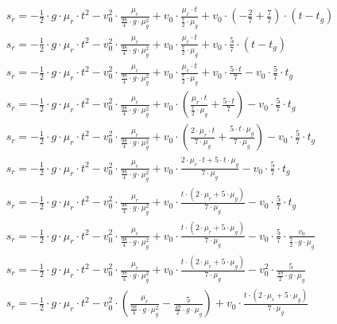 \begin{align}
    s_r = - \frac{1}{2} \cdot g \cdot \mu_r \cdot t^2 - v_0^2 \cdot \frac{\mu_r}{\frac{98}{4} \cdot g \cdot \mu_g^2} + v_0 \cdot \frac{\mu_r \cdot t}{\frac{7}{2} \cdot \mu_g} + v_0 \cdot (-\frac{2}{7} + \frac{7}{7}) \cdot (t - t_g)\\
    s_r = - \frac{1}{2} \cdot g \cdot \mu_r \cdot t^2 - v_0^2 \cdot \frac{\mu_r}{\frac{98}{4} \cdot g \cdot \mu_g^2} + v_0 \cdot \frac{\mu_r \cdot t}{\frac{7}{2} \cdot \mu_g} + v_0 \cdot \frac{5}{7} \cdot (t - t_g)\\
    s_r = - \frac{1}{2} \cdot g \cdot \mu_r \cdot t^2 - v_0^2 \cdot \frac{\mu_r}{\frac{98}{4} \cdot g \cdot \mu_g^2} + v_0 \cdot \frac{\mu_r \cdot t}{\frac{7}{2} \cdot \mu_g} + v_0 \cdot \frac{5 \cdot t}{7} - v_0 \cdot \frac{5}{7} \cdot t_g\\
    s_r = - \frac{1}{2} \cdot g \cdot \mu_r \cdot t^2 - v_0^2 \cdot \frac{\mu_r}{\frac{98}{4} \cdot g \cdot \mu_g^2} + v_0 \cdot (\frac{\mu_r \cdot t}{\frac{7}{2} \cdot \mu_g} + \frac{5 \cdot t}{7}) - v_0 \cdot \frac{5}{7} \cdot t_g\\
    s_r = - \frac{1}{2} \cdot g \cdot \mu_r \cdot t^2 - v_0^2 \cdot \frac{\mu_r}{\frac{98}{4} \cdot g \cdot \mu_g^2} + v_0 \cdot (\frac{2 \cdot \mu_r \cdot t}{7 \cdot \mu_g} + \frac{5 \cdot t \cdot \mu_g}{7 \cdot \mu_g}) - v_0 \cdot \frac{5}{7} \cdot t_g\\
    s_r = - \frac{1}{2} \cdot g \cdot \mu_r \cdot t^2 - v_0^2 \cdot \frac{\mu_r}{\frac{98}{4} \cdot g \cdot \mu_g^2} + v_0 \cdot \frac{2 \cdot \mu_r \cdot t + 5 \cdot t \cdot \mu_g}{7 \cdot \mu_g} - v_0 \cdot \frac{5}{7} \cdot t_g\\
    s_r = - \frac{1}{2} \cdot g \cdot \mu_r \cdot t^2 - v_0^2 \cdot \frac{\mu_r}{\frac{98}{4} \cdot g \cdot \mu_g^2} + v_0 \cdot \frac{t \cdot (2 \cdot \mu_r + 5 \cdot \mu_g)}{7 \cdot \mu_g} - v_0 \cdot \frac{5}{7} \cdot t_g\\
    s_r = - \frac{1}{2} \cdot g \cdot \mu_r \cdot t^2 - v_0^2 \cdot \frac{\mu_r}{\frac{98}{4} \cdot g \cdot \mu_g^2} + v_0 \cdot \frac{t \cdot (2 \cdot \mu_r + 5 \cdot \mu_g)}{7 \cdot \mu_g} - v_0 \cdot \frac{5}{7} \cdot \frac{v_0}{\frac{7}{2} \cdot g \cdot \mu_g}\\
    s_r = - \frac{1}{2} \cdot g \cdot \mu_r \cdot t^2 - v_0^2 \cdot \frac{\mu_r}{\frac{98}{4} \cdot g \cdot \mu_g^2} + v_0 \cdot \frac{t \cdot (2 \cdot \mu_r + 5 \cdot \mu_g)}{7 \cdot \mu_g} - v_0^2 \cdot \frac{5}{\frac{49}{2} \cdot g \cdot \mu_g}\\
    s_r = - \frac{1}{2} \cdot g \cdot \mu_r \cdot t^2 - v_0^2 \cdot (\frac{\mu_r}{\frac{98}{4} \cdot g \cdot \mu_g^2} - \frac{5}{\frac{49}{2} \cdot g \cdot \mu_g}) + v_0 \cdot \frac{t \cdot (2 \cdot \mu_r + 5 \cdot \mu_g)}{7 \cdot \mu_g}\\

\end{align}
